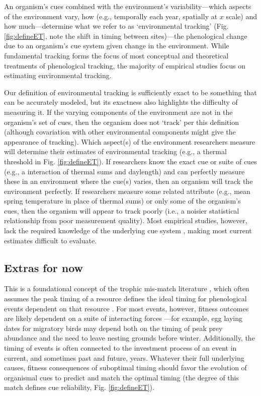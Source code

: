 \documentclass[11pt,letterpaper]{article}
\begin{document}
An organism's cues combined with the environment's variability---which aspects of the environment vary, how (e.g., temporally each year, spatially at $x$ scale) and how much---determine what we refer to as `environmental tracking' (Fig. \ref{fig:defineET}, note the shift in timing between sites)---the phenological change due to an organism's cue system given change in the environment. While fundamental tracking forms the focus of most conceptual and theoretical treatments of phenological tracking, the majority of  empirical studies focus on estimating environmental tracking. 

Our definition of environmental tracking is sufficiently exact to be something that can be accurately modeled,  but its exactness also highlights the difficulty of measuring it. If the varying components of the environment are not in the organism's set of cues, then the organism does not `track' per this definition (although covariation with other environmental components might give the appearance of tracking).  Which aspect(s) of the environment researchers measure will determine their estimates of environmental tracking (e.g., a thermal threshold in Fig. \ref{fig:defineET}). If researchers know the exact cue or suite of cues (e.g., a interaction of thermal sums and daylength) and can perfectly measure these in an environment where the cue(s) varies, then an organism will track the environment perfectly. If researchers measure some related attribute (e.g., mean spring temperature in place of thermal sums) or only some of the organism's cues, then the organism will appear to track poorly (i.e., a noisier statistical relationship from poor measurement quality). Most empirical studies, however, lack the required knowledge of the underlying cue system \citep{chmura2019}, making most current estimates difficult to evaluate. %

\iffalse
\subsection{Extras for now}
This is a foundational concept of the trophic mis-match literature \citep{vissergienapp2019}, which often assumes the peak timing of a resource defines the ideal timing for phenological events dependent on that resource \citep[e.g. egg laying dates dependent on caterpillar abundance,][]{Visser:2005bg}. For most events, however, fitness outcomes are likely dependent on a suite of interacting forces \citep[e.g.,][]{reed2013}---for example, egg laying dates for migratory birds may depend both on the timing of peak prey abundance and the need to leave nesting grounds before winter. Additionally, the timing of events is often connected to the investment process of an event \citep[e.g., number of eggs in a clutch,][]{inouye2019} in current, and sometimes past and future, years. Whatever their full underlying causes, fitness consequences of suboptimal timing should favor the evolution of organismal cues to predict and match the optimal timing (the degree of this match defines cue reliability, Fig. \ref{fig:defineET}). 
\end{document}
